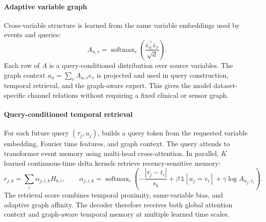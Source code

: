 \documentclass[preprint,12pt]{elsarticle}
\begin{document}
\paragraph{Adaptive variable graph}
Cross-variable structure is learned from the same variable embeddings used by
events and queries:
\begin{equation}
    A_{u,v} = \operatorname{softmax}_v\left(\frac{\bar e_u^\top \bar e_v}{\sqrt d}\right).
\end{equation}
Each row of $A$ is a query-conditioned distribution over source variables. The
graph context $a_u=\sum_v A_{u,v}e_v$ is projected and used in query
construction, temporal retrieval, and the graph-aware expert. This gives the
model dataset-specific channel relations without requiring a fixed clinical or sensor graph.

\paragraph{Query-conditioned temporal retrieval}
For each future query $(\tau_j,u_j)$, \method{} builds a query token from the
requested variable embedding, Fourier time features, and graph context. The
query attends to transformer event memory using multi-head cross-attention. In
parallel, $K$ learned continuous-time delta kernels retrieve recency-sensitive
memory:
\begin{equation}
    r_{j,k}=\sum_i \alpha_{j,i,k}H_{b,i},\qquad
    \alpha_{j,i,k}=\operatorname{softmax}_i\left(
    -\frac{|\tau_j-t_i|}{s_k}
    + \beta\,\mathbb{1}[u_j=v_i]
    + \gamma\log A_{u_j,v_i}\right).
\end{equation}
The retrieval score combines temporal proximity, same-variable bias, and
adaptive graph affinity. The decoder therefore receives both global attention
context and graph-aware temporal memory at multiple learned time scales.
\end{document}
